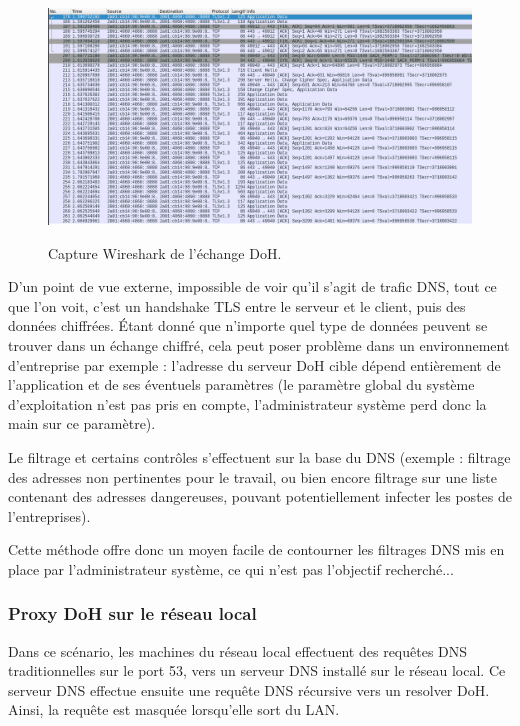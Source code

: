 \documentclass[a4paper,12pt]{article}
\begin{document}
	
 	\begin{figure}[H]
	 	\begin{center}
	 		{\includegraphics[scale=0.55]{Images/doh-wireshark.png}}
	 	\end{center}
	 	\caption{Capture Wireshark de l'échange DoH.}
	\end{figure}

	D'un point de vue externe, impossible de voir qu'il s'agit de trafic DNS, tout ce que l'on voit, c'est un handshake TLS entre le serveur et le client, puis des données chiffrées. Étant donné que n'importe quel type de données peuvent se trouver dans un échange chiffré, cela peut poser problème dans un environnement d'entreprise par exemple : l'adresse du serveur DoH cible dépend entièrement de l'application et de ses éventuels paramètres (le paramètre global du système d'exploitation n'est pas pris en compte, l'administrateur système perd donc la main sur ce paramètre). 
	
	Le filtrage et certains contrôles s'effectuent sur la base du DNS (exemple : filtrage des adresses non pertinentes pour le travail, ou bien encore filtrage sur une liste contenant des adresses dangereuses, pouvant potentiellement infecter les postes de l'entreprises). 
	
	Cette méthode offre donc un moyen facile de contourner les filtrages DNS mis en place par l'administrateur système, ce qui n'est pas l'objectif recherché...
	
	\subsubsection{Proxy DoH sur le réseau local}
	
	Dans ce scénario, les machines du réseau local effectuent des requêtes DNS traditionnelles sur le port 53, vers un serveur DNS installé sur le réseau local. Ce serveur DNS effectue ensuite une requête DNS récursive vers un resolver DoH. Ainsi, la requête est masquée lorsqu'elle sort du LAN.
	
\end{document}
